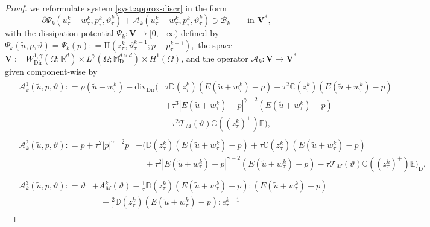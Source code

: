 \documentclass[a4paper,10pt,reqno]{amsart}
\numberwithin{equation}{section}
\newcommand{\bbM}{\mathbb{M}}
\newcommand{\R}{\mathbb{R}}
\numberwithin{equation}{section}
\newcommand{\teta}{\vartheta}
\newcommand{\sig}[1]{E(#1)}
\newcommand{\Dir}{\mathrm{Dir}}
\newcommand{\bbC}{\mathbb{C}}
\newcommand{\bbD}{\mathbb{D}}
\newcommand{\bbE}{\mathbb{E}}
\newcommand{\mt}{\bbM}
\newcommand{\dev}{\mathrm{D}}
\newcommand{\dip}[3]{\mathrm{H}(#1,#2;#3)}
\newcommand{\rbspv}{\mathbf{V}}
\newcommand{\wtau}[1]{w_\tau^{#1}}
\newcommand{\utau}[1]{u_\tau^{#1}}
\newcommand{\ptau}[1]{p_\tau^{#1}}
\newcommand{\ztau}[1]{z_\tau^{#1}}
\newcommand{\etau}[1]{e_\tau^{#1}}
\newcommand{\tetau}[1]{\teta_\tau^{#1}}
\newcommand{\EEE}{\color{black}}
\newcommand{\MMM}{\color{black}}%
\begin{document}
\begin{proof}
we reformulate system \eqref{syst:approx-discr} in the form 
\begin{equation}
\label{pseudo-monot}
\partial\Psi_k (\utau k -\wtau k ,  \ptau k,\tetau k) +\mathscr{A}_k (\utau k -\wtau k ,  \ptau k,\tetau k ) \ni \mathscr{B}_k \qquad \text{in } \rbspv^*,
\end{equation}
 with   the dissipation potential 
 $
 \Psi_k : \rbspv\to [0,+\infty) $ defined by $  \Psi_k (\tilde{u}, p,\teta)  = \Psi_k(p): =  \dip{\ztau{k}}{\tetau{k-1}}{p{-}\ptau{k-1}},
 $
  \MMM the space $ \rbspv:= W_\Dir^{1,\gamma} (\Omega;\R^d)  \times 
L^\gamma (\Omega;\mt_\dev^{d\times d}) \times H^1(\Omega) $,
 and the operator \MMM  $\mathscr{A}_k : \rbspv \to  \rbspv^* $ \EEE  given component-wise by 
\begin{subequations}
\label{oper-scrA}
\begin{align}
& 
\label{oper-scrA-1}
\begin{aligned}
\mathscr{A}_k^1 (\tilde u,p,\teta): =   \rho (\tilde u -\wtau k) - \mathrm{div}_{\Dir}\Big(  & \tau \bbD(\ztau{k}) \left( \sig{\tilde u + \wtau k} -p   \right) 
+\tau^2 {\bbC}(\ztau k)   \left( \sig{\tilde u + \wtau k} -p   \right) \\ & + \tau^3 \left|   \sig{\tilde u + \wtau k} -p    \right|^{\gamma-2}   \left( \sig{\tilde u + \wtau k} -p   \right) 
\\
& 
-\tau^2 \mathcal{T}_M(\teta) {\bbC}((\ztau{k})^+)\bbE \Big),
\end{aligned}
\\
& 
\label{oper-scrA-2}\begin{aligned}
\mathscr{A}_k^2(\tilde u, p,\teta): =  p + \tau^2 |p|^{\gamma-2} p
& 
- \Big(   \bbD (\ztau{k})\left( \sig{\tilde u + \wtau k} -p   \right) +\tau  {\bbC}(\ztau k)   \left( \sig{\tilde u + \wtau k} -p   \right) \\  & \quad  + 
\tau^2 \left|   \sig{\tilde u + \wtau k} -p    \right|^{\gamma-2}   \left( \sig{\tilde u + \wtau k} -p   \right) -\tau \mathcal{T}_M(\teta) {\bbC}((\ztau k)^+) \bbE \Big)_\dev,
\end{aligned}
\\
& 
\label{oper-scrA-3}
\begin{aligned}
\mathscr{A}_k^3 ( \tilde u,p,\teta): =
   \teta & + A_M^k(\teta)  
      -\frac1\tau \bbD(\ztau{k}) \left(\sig{\tilde u + \wtau k} -p \right){:} \left(\sig{\tilde u + \wtau k} -p \right)
      \\ & \quad
       -\frac2\tau \bbD(\ztau{k}) \left(\sig{\tilde u + \wtau k} -p \right){:}\etau{k-1} 

\end{aligned}
\end{align}
\end{subequations}
\end{proof}
\end{document}
